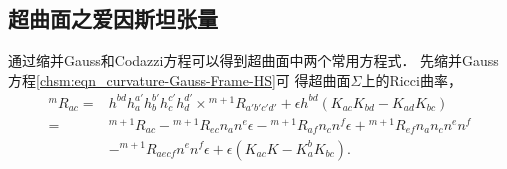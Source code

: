 \subsection{超曲面之爱因斯坦张量}
通过缩并Gauss和Codazzi方程可以得到超曲面中两个常用方程式．
先缩并Gauss方程\eqref{chsm:eqn_curvature-Gauss-Frame-HS}可
得超曲面$\Sigma$上的Ricci曲率，  %
\begin{equation}\label{chsm:eqn_contractRicci}
\begin{aligned}
    {}^{m}{R}_{ac}=&   %
      h^{bd} h_a^{a'}h_b^{b'}h_c^{c'}h_d^{d'}
    \times {}^{m+1}{R}_{a' b' c' d' } +\epsilon h^{bd} (K_{ac}K_{bd} - K_{ad} K_{bc} ) \\
    =&{}^{m+1} {R}_{ac}
    -{}^{m+1}{R}_{ec} {n}_{a} {n}^{e} \epsilon
    -{}^{m+1}{R}_{af} {n}_{c} {n}^{f} \epsilon
    +{}^{m+1}{R}_{ef} {n}_{a} {n}_{c} {n}^{e} {n}^{f}  \\
    &- {}^{m+1}{R}_{aecf} {n}^{e} {n}^{f} \epsilon
    +\epsilon (K_{ac}K - K_{a}^b K_{bc} ) .
\end{aligned}
\end{equation}  %
